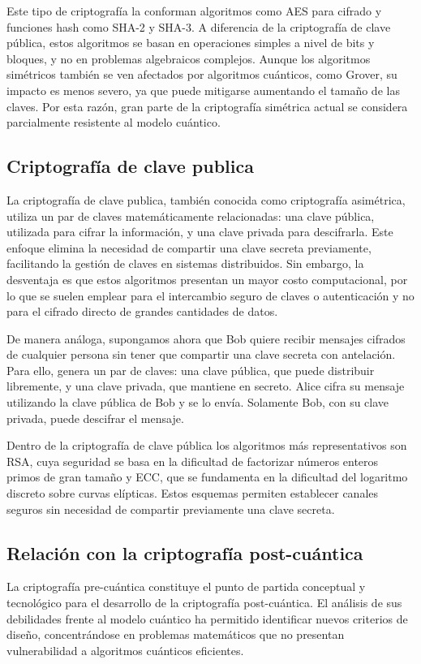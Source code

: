 Este tipo de criptografía la conforman algoritmos como AES para cifrado y funciones hash como SHA-2 y SHA-3. A diferencia de la criptografía de clave pública, estos algoritmos se basan en operaciones simples a nivel de bits y bloques, y no en problemas algebraicos complejos. Aunque los algoritmos simétricos también se ven afectados por algoritmos cuánticos, como Grover, su impacto es menos severo, ya que puede mitigarse aumentando el tamaño de las claves. Por esta razón, gran parte de la criptografía simétrica actual se considera parcialmente resistente al modelo cuántico.

\subsection{Criptografía de clave publica}
La criptografía de clave publica, también conocida como criptografía asimétrica, utiliza un par de claves matemáticamente relacionadas: una clave pública, utilizada para cifrar la información, y una clave privada para descifrarla. Este enfoque elimina la necesidad de compartir una clave secreta previamente, facilitando la gestión de claves en sistemas distribuidos. Sin embargo, la desventaja es que estos algoritmos presentan un mayor costo computacional, por lo que se suelen emplear para el intercambio seguro de claves o autenticación y no para el cifrado directo de grandes cantidades de datos.

De manera análoga, supongamos ahora que Bob quiere recibir mensajes cifrados de cualquier persona sin tener que compartir una clave secreta con antelación. Para ello, genera un par de claves: una clave pública, que puede distribuir libremente, y una clave privada, que mantiene en secreto. Alice cifra su mensaje utilizando la clave pública de Bob y se lo envía. Solamente Bob, con su clave privada, puede descifrar el mensaje.

Dentro de la criptografía de clave pública los algoritmos más representativos son RSA, cuya seguridad se basa en la dificultad de factorizar números enteros primos de gran tamaño y ECC, que se fundamenta en la dificultad del logaritmo discreto sobre curvas elípticas. Estos esquemas permiten establecer canales seguros sin necesidad de compartir previamente una clave secreta.

\subsection{Relación con la criptografía post-cuántica}
La criptografía pre-cuántica constituye el punto de partida conceptual y tecnológico para el desarrollo de la criptografía post-cuántica. El análisis de sus debilidades frente al modelo cuántico ha permitido identificar nuevos criterios de diseño, concentrándose en problemas matemáticos que no presentan vulnerabilidad a algoritmos cuánticos eficientes.

